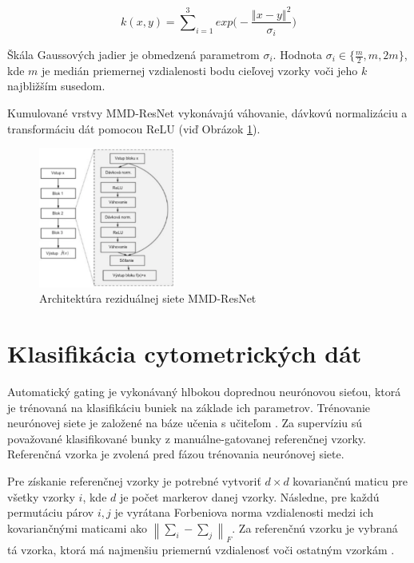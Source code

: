 \begin{equation}
k(x,y) = {\sum^3}_{i=1}exp\bigg(-\frac{{\left\Vert x-y \right\Vert}^2}{\sigma_i}\bigg)
\end{equation}

Škála Gaussových jadier je obmedzená parametrom $\sigma_i$. Hodnota $\sigma_i \in \{\frac{m}{2}, m, 2m\}$, kde $m$ je medián priemernej vzdialenosti bodu cieľovej vzorky voči jeho $k$ najbližším susedom.

Kumulované vrstvy MMD-ResNet vykonávajú váhovanie, dávkovú normalizáciu a transformáciu dát pomocou ReLU (viď Obrázok \ref{MMD-ResNet_arch}). 

\begin{figure}
\centerline{\includegraphics[width=0.4\textwidth]{images/MMD-ResNet_arch.png}}
\caption[Architektúra MMD-ResNet]{Architektúra reziduálnej siete MMD-ResNet}
\label{MMD-ResNet_arch}
\end{figure}



\section{Klasifikácia cytometrických dát}

Automatický gating je vykonávaný hlbokou doprednou neurónovou sieťou, ktorá je trénovaná na klasifikáciu buniek na základe ich parametrov. Trénovanie neurónovej siete je založené na báze učenia s učiteľom \cite{Goh1995}. Za supervíziu sú považované klasifikované bunky z  manuálne-gatovanej referenčnej vzorky. Referenčná vzorka je zvolená pred fázou trénovania neurónovej siete. 

Pre získanie referenčnej vzorky je potrebné vytvoriť $d \times d$ kovariančnú maticu pre všetky vzorky $i$, kde $d$ je počet markerov danej vzorky. Následne, pre každú permutáciu párov $i,j$ je vyrátana Forbeniova norma vzdialenosti medzi ich kovariančnými maticami ako $\left\lVert\sum_{i}-\sum_{j}\right\rVert_F$. Za referenčnú vzorku je vybraná tá vzorka, ktorá má najmenšiu priemernú vzdialenosť voči ostatným vzorkám \cite{Li2017}.

